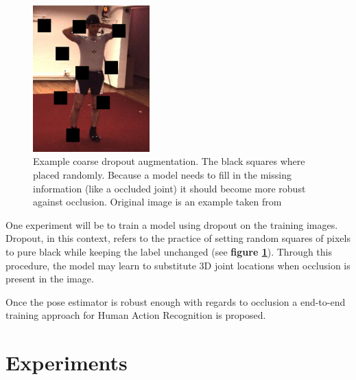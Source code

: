\documentclass[twoside]{article}
\begin{document}
\begin{multicols}{2}
\begin{figure}[H]
    \centering
    \includegraphics[width=0.4\textwidth]{dropout.png}
    \caption{Example coarse dropout augmentation. The black squares where placed randomly. Because a model needs to fill in the missing information (like a occluded joint) it should become more robust against occlusion. Original image is an example taken from \cite{ionescu_human3.6m:_2014}}
    \label{fig:dropout}
\end{figure}

One experiment will be to train a model using dropout on the training images.
Dropout, in this context, refers to the practice of setting random squares of pixels to pure black while keeping the label unchanged (see \textbf{figure \ref{fig:dropout}}).
Through this procedure, the model may learn to substitute 3D joint locations when occlusion is present in the image.

Once the pose estimator is robust enough with regards to occlusion a end-to-end training approach for Human Action Recognition is proposed.



\section{Experiments}
\label{sec:experiment}

\end{multicols}
\end{document}
